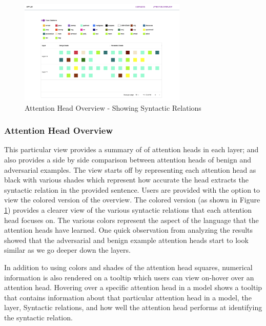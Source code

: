 \documentclass[journal]{vgtc}                %
\begin{document}
\begin{figure}[tb]
    \centering
    
    \includegraphics[width=8cm]{figures/Attention_Head_Overview_Syntactic.png}
    \caption{Attention Head Overview - Showing Syntactic Relations}
    \label{fig:attention_head_syntactic_visualization}
    
\end{figure}

\subsubsection{Attention Head Overview} This particular view provides a summary of of attention heads in each layer; and also provides a side by side comparison between attention heads of benign and adversarial examples. The view starts off by representing each attention head as black with various shades which represent how accurate the head extracts the syntactic relation in the provided sentence. Users are provided with the option to view the colored version of the overview. The colored version (as shown in Figure \ref{fig:attention_head_syntactic_visualization}) provides a clearer view of the various syntactic relations that each attention head focuses on. The various colors represent the aspect of the language that the attention heads have learned. One quick observation from analyzing the results showed that the adversarial and benign example attention heads start to look similar as we go deeper down the layers. 

In addition to using colors and shades of the attention head squares, numerical information is also rendered on a tooltip which users can view on-hover over an attention head. Hovering over a specific attention head in a model shows a tooltip that contains information about that particular attention head in a model, the layer, Syntactic relations, and how well the attention head performs at identifying the syntactic relation.
\end{document}
